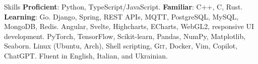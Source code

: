 

\begin{rubric}{Skills}
	\small{\textbf{Proficient}: Python, TypeScript/JavaScript. \textbf{Familiar}: C++, C, Rust. \textbf{Learning}: Go.}
	\small {Django, Spring, REST APIs, MQTT, PostgreSQL, MySQL, MongoDB, Redis.}
%
	\small{Angular, Svelte, Highcharts, ECharts, WebGL2, responsive UI development.}
%
\entry*[\textbf{ML/DS}]
	\small{PyTorch, TensorFlow, Scikit-learn, Pandas, NumPy, Matplotlib, Seaborn.}
%
	\small{Linux (Ubuntu, Arch), Shell scripting, \textsc{Git}, Docker, Vim, Copilot, ChatGPT.}
%
	\small {Fluent in English, Italian, and Ukrainian.}
\end{rubric}
